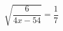 \begin{ex}[type=equation]
	\begin{condition}
		\( \sqrt{\dfrac{6}{4x-54}}=\dfrac{1}{7} \)
	\end{condition}
\end{ex}